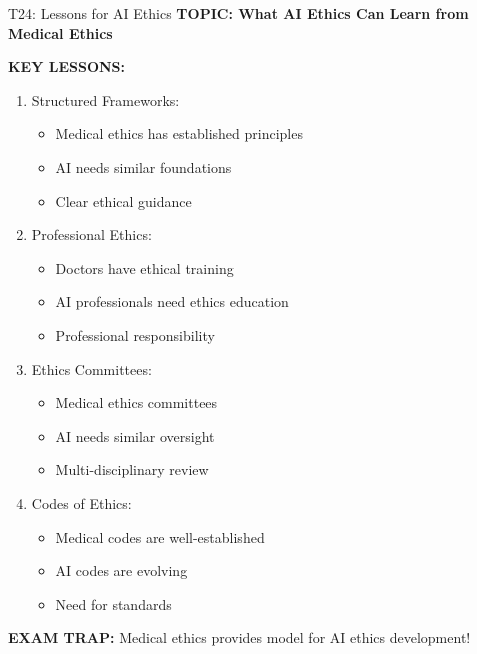 \documentclass[8pt]{beamer}
\begin{document}
	\begin{frame}{T24: Lessons for AI Ethics}
		\fontsize{6.5}{7.5}\selectfont
		\textbf{TOPIC: What AI Ethics Can Learn from Medical Ethics}
		
		\vspace{0.1cm}
		\textbf{KEY LESSONS:}
		\begin{enumerate}
			\item \textcolor{myblue}{Structured Frameworks:}
			\begin{itemize}
				\item Medical ethics has established principles
				\item AI needs similar foundations
				\item Clear ethical guidance
			\end{itemize}
			\item \textcolor{myblue}{Professional Ethics:}
			\begin{itemize}
				\item Doctors have ethical training
				\item AI professionals need ethics education
				\item Professional responsibility
			\end{itemize}
			\item \textcolor{myblue}{Ethics Committees:}
			\begin{itemize}
				\item Medical ethics committees
				\item AI needs similar oversight
				\item Multi-disciplinary review
			\end{itemize}
			\item \textcolor{myblue}{Codes of Ethics:}
			\begin{itemize}
				\item Medical codes are well-established
				\item AI codes are evolving
				\item Need for standards
			\end{itemize}
		\end{enumerate}
		
		\textcolor{myred}{\textbf{EXAM TRAP:}} Medical ethics provides \textcolor{myblue}{model for AI ethics development}!
	\end{frame}
	
	
\end{document}
